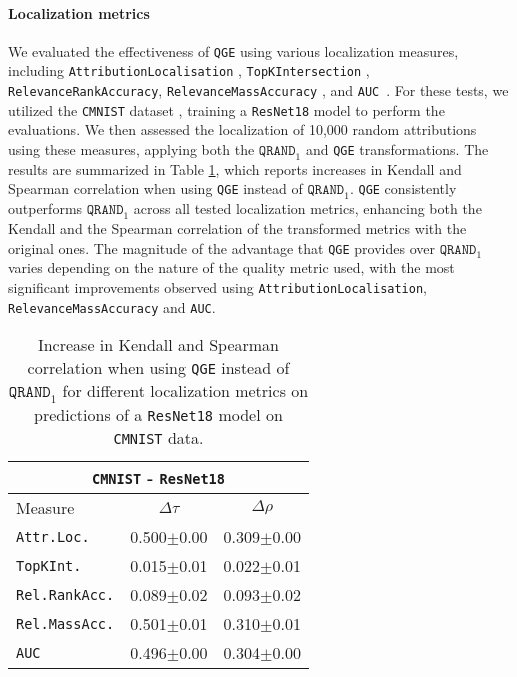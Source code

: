 \paragraph{Localization metrics}
We evaluated the effectiveness of \texttt{QGE} using various localization measures, including \texttt{AttributionLocalisation} \cite{kohlbrenner2020towards}, \texttt{TopKIntersection} \cite{theiner2021}, \texttt{RelevanceRankAccuracy}, \texttt{RelevanceMassAccuracy} \cite{arras2021ground}, and \texttt{AUC}~\cite{Fawcett}. For these tests, we utilized the \texttt{CMNIST} dataset \cite{bykov2021noisegrad}, training a \texttt{ResNet18} model to perform the evaluations. We then assessed the localization of 10,000 random attributions using these measures, applying both the $\texttt{QRAND}_1$ and \texttt{QGE} transformations. The results are summarized in Table \ref{tab:effects_localization}, which reports increases in Kendall and Spearman correlation when using \texttt{QGE} instead of $\texttt{QRAND}_1$. \texttt{QGE} consistently outperforms $\texttt{QRAND}_1$ across all tested localization metrics, enhancing both the Kendall and the Spearman correlation of the transformed metrics with the original ones. The magnitude of the advantage that \texttt{QGE} provides over $\texttt{QRAND}_1$ varies depending on the nature of the quality metric used, with the most significant improvements observed using \texttt{AttributionLocalisation}, \texttt{RelevanceMassAccuracy} and \texttt{AUC}.

\begin{table}[!t]
    \vskip 0.15in
    \begin{center}
    \begin{small}
    \begin{sc}
    \begin{tabular}{l|c|c}
        \multicolumn{3}{c}{\texttt{CMNIST} - \texttt{ResNet18}}\\
        \toprule
        Measure &$\Delta \tau$ & $\Delta\rho$\\
        \hline
        \texttt{Attr.Loc.} & 0.500$\pm$0.00 & 0.309$\pm$0.00\\
        \texttt{TopKInt.} & 0.015$\pm$0.01 & 0.022$\pm$0.01\\
        \texttt{Rel.RankAcc.} & 0.089$\pm$0.02 & 0.093$\pm$0.02\\
        \texttt{Rel.MassAcc.} & 0.501$\pm$0.01 & 0.310$\pm$0.01\\
        \texttt{AUC} & 0.496$\pm$0.00 & 0.304$\pm$0.00\\
        \hline
    \end{tabular}
    \end{sc}
    \end{small}
    \end{center}
    \caption{Increase in Kendall and Spearman correlation when using \texttt{QGE} instead of $\texttt{QRAND}_1$ for different localization metrics %
    on predictions of a \texttt{ResNet18} model on \texttt{CMNIST} data.}
    \label{tab:effects_localization}
\end{table}

